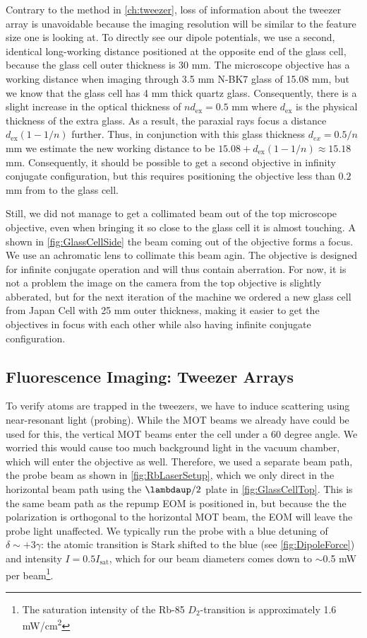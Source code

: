 Contrary to the method in \cref{ch:tweezer}, loss of information about the tweezer array is unavoidable because the imaging resolution will be similar to the feature size one is looking at.
To directly see our dipole potentials, we use a second, identical long-working distance positioned at the opposite end of the glass cell, because the glass cell outer thickness is 30 mm. 
The microscope objective has a working distance when imaging through 3.5 mm N-BK7 glass of 15.08 mm, but we know that the glass cell has 4 mm thick quartz glass.
Consequently, there is a slight increase in the optical thickness of $n d_{\text{ex}}= 0.5$ mm where $d_{\text{ex}}$ is the physical thickness of the extra glass.
As a result, the paraxial rays focus a distance $d_{\text{ex}}(1-1/n)$ further.
Thus, in conjunction with this glass thickness $d_{ex} = 0.5/n$ mm we estimate the new working distance to be $15.08 + d_{\text{ex}}(1-1/n) \approx 15.18$ mm.
Consequently, it should be possible to get a second objective in infinity conjugate configuration, but this requires positioning the objective less than $0.2$ mm from to the glass cell.

Still, we did not manage to get a collimated beam out of the top microscope objective, even when bringing it so close to the glass cell it is almost touching. 
A shown in \cref{fig:GlassCellSide} the beam coming out of the objective forms a focus.
We use an achromatic lens to collimate this beam agin.
The objective is designed for infinite conjugate operation and will thus contain aberration. 
For now, it is not a problem the image on the camera from the top objective is slightly abberated, but for the next iteration of the machine we ordered a new glass cell from Japan Cell with 25 mm outer thickness, making it easier to get the objectives in focus with each other while also having infinite conjugate configuration.

\subsection{Fluorescence Imaging: Tweezer Arrays}


To verify atoms are trapped in the tweezers, we have to induce scattering using near-resonant light (probing). 
While the MOT beams we already have could be used for this, the vertical MOT beams enter the cell under a 60 degree angle.
We worried this would cause too much background light in the vacuum chamber, which will enter the objective as well. 
Therefore, we used a separate beam path, the probe beam as shown in \cref{fig:RbLaserSetup}, which we only direct in the horizontal beam path using the $\lambdaup/2$ plate in \cref{fig:GlassCellTop}.
This is the same beam path as the repump EOM is positioned in, but because the the polarization is orthogonal to the horizontal MOT beam, the EOM will leave the probe light unaffected. 
We typically run the probe with a blue detuning of $\delta \sim +3\gamma$: the atomic transition is Stark shifted to the blue (see \cref{fig:DipoleForce}) and intensity $I = 0.5 I_{\text{sat}}$, which for our beam diameters comes down to $\sim0.$5 mW per beam\footnote{The saturation intensity of the Rb-85 $D_2$-transition is approximately 1.6 mW/cm\textsuperscript{2}}. 

